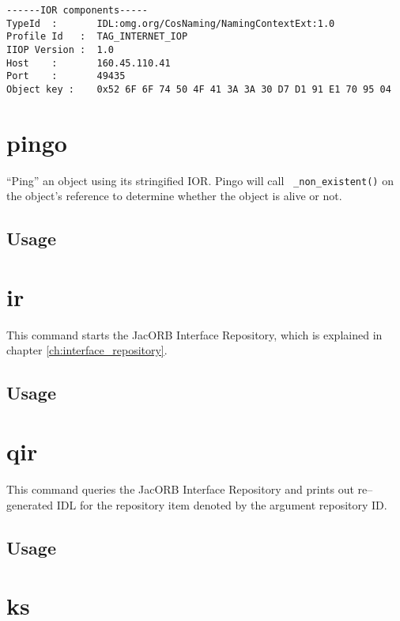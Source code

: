 \small{\begin{verbatim}
------IOR components-----
TypeId  :       IDL:omg.org/CosNaming/NamingContextExt:1.0
Profile Id   :  TAG_INTERNET_IOP
IIOP Version :  1.0
Host    :       160.45.110.41
Port    :       49435
Object key :    0x52 6F 6F 74 50 4F 41 3A 3A 30 D7 D1 91 E1 70 95 04
\end{verbatim}
}

\section{pingo}

``Ping'' an object using its stringified IOR. Pingo will call {\tt
  \_non\_existent()} on the object's reference to determine whether
  the object is alive or not.

\subsection*{Usage}


\section{ir}

This command starts the JacORB Interface Repository, which is explained in
chapter \ref{ch:interface_repository}.

\subsection*{Usage}


\section{qir}

This command queries the JacORB Interface Repository and prints out
re--generated IDL for the repository item denoted by the argument
repository ID.

\subsection*{Usage}


\section{ks}

